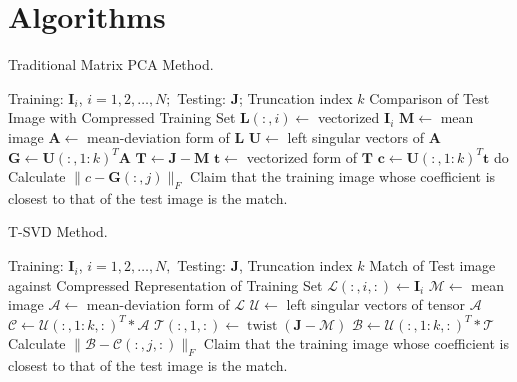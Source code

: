 \documentclass[english]{article}
\newcommand{\<}{\langle}
\renewcommand{\>}{\rangle}
\theoremstyle{definition}
\begin{document}
\section{Algorithms}
\begin{algorithm}  
	\caption{Traditional Matrix PCA Method.}
	\begin{algorithmic} 
		\Require  
		Training:  $\mathbf{I}_{i}$, $i=1,2, \ldots, N; $ Testing: $ \mathbf{J}$;  Truncation index $ k $
		\Ensure  
		Comparison of Test Image with Compressed Training Set  
		\State $ \mathbf{L}(:, i) \leftarrow $ vectorized $ \mathbf{I}_{i} $
		\EndFor
		\State $ \mathbf{M} \leftarrow $ mean image
		\State $ \mathbf{A} \leftarrow $ mean-deviation form of $ \mathbf{L}  $
		\State $ \mathbf{U} \leftarrow $ left singular vectors of $ \mathbf{A} $  
		\State $\mathbf{G} \leftarrow \mathbf{U}(:, 1: k)^{T} \mathbf{A} $
		\State $ \mathbf{T} \leftarrow \mathbf{J}-\mathbf{M} $
		\State $ \mathbf{t} \leftarrow $ vectorized form of $ \mathbf{T} $  
		\State $ \mathbf{c} \leftarrow \mathbf{U}(:, 1: k)^{T} \mathbf{t}  $
		\State do Calculate $ \|c-\mathbf{G}(:, j)\|_{F}$
		\EndFor
		\State Claim that the training image whose coefficient is closest to that of the test image is the match. 
	\end{algorithmic}
\end{algorithm}  

\begin{algorithm}  
	\caption{T-SVD Method.}
	\begin{algorithmic} 
		\Require  
		Training:  $\mathbf{I}_{i}$, $i=1,2, \ldots, N, $ Testing: $ \mathbf{J}$,  Truncation index $ k $
		\Ensure  
		Match of Test image against Compressed Representation of Training Set  
		\For  {$i=1 \quad to \quad N $}
		\State  $\mathcal{L}(:, i,:) \leftarrow \mathbf{I}_{i}$
		\EndFor
		\State $ \mathcal{M} \leftarrow $ mean image
		\State $ \mathcal{A} \leftarrow $ mean-deviation form of $ \mathcal{L}  $
		\State $ \mathcal{U} \leftarrow $ left singular vectors of tensor $ \mathcal{A} $
		\State $ \mathcal{C} \leftarrow \mathcal{U}(:, 1: k,:)^{T} * \mathcal{A} $
		\State $ \mathcal{T}(:, 1,:) \leftarrow \operatorname{twist}(\mathbf{J}-\mathcal{M})  $
		\State $ \mathcal{B} \leftarrow \mathcal{U}(:, 1: k,:)^{T} * \mathcal{T} $
		\For  {$j=1 \quad to \quad N $}
		\State Calculate $ \|\mathcal{B}-\mathcal{C}(:, j,:)\|_{F} $
		\EndFor
		\State Claim that the training image whose coefficient is closest to that of the test image is the match. 
	\end{algorithmic}
\end{algorithm}
\end{document}
